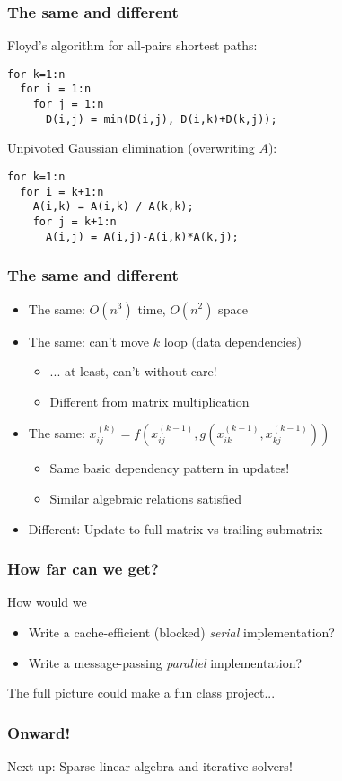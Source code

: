 \documentclass{beamer}
\begin{document}
\begin{frame}[fragile]
  \frametitle{The same and different}

Floyd's algorithm for all-pairs shortest paths:
\begin{lstlisting}
for k=1:n
  for i = 1:n
    for j = 1:n
      D(i,j) = min(D(i,j), D(i,k)+D(k,j));
\end{lstlisting}

\vspace{5mm}
Unpivoted Gaussian elimination (overwriting $A$):
\begin{lstlisting}
for k=1:n
  for i = k+1:n
    A(i,k) = A(i,k) / A(k,k);
    for j = k+1:n
      A(i,j) = A(i,j)-A(i,k)*A(k,j);
\end{lstlisting}

\end{frame}


\begin{frame}
  \frametitle{The same and different}
  
  \begin{itemize}
  \item The same: $O(n^3)$ time, $O(n^2)$ space
  \item The same: can't move $k$ loop (data dependencies)
    \begin{itemize}
    \item ... at least, can't without care!
    \item Different from matrix multiplication
    \end{itemize}
  \item The same: 
    $x_{ij}^{(k)} = f\left(x_{ij}^{(k-1)}, 
    g\left(x_{ik}^{(k-1)}, x_{kj}^{(k-1)}\right)\right)$
    \begin{itemize}
    \item Same basic dependency pattern in updates!
    \item Similar algebraic relations satisfied
    \end{itemize}
  \item Different: Update to full matrix vs trailing submatrix
  \end{itemize}
\end{frame}


\begin{frame}
  \frametitle{How far can we get?}
  
  How would we
  \begin{itemize}
  \item Write a cache-efficient (blocked) {\em serial} implementation?
  \item Write a message-passing {\em parallel} implementation?
  \end{itemize}

  \vspace{1cm}
  The full picture could make a fun class project...

\end{frame}


\begin{frame}
  \frametitle{Onward!}
  
  Next up: Sparse linear algebra and iterative solvers!
\end{frame}
\end{document}
